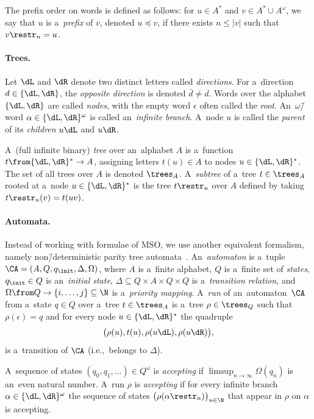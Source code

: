 \documentclass{lmcs}
\numberwithin{equation}{section}
\numberwithin{figure}{section}
\begin{document}
The prefix order on words is defined as follows: for $u\in A^\ast$ and $v\in A^\ast\cup A^\omega$, we say that $u$ is a~\emph{prefix} of $v$, denoted $u\preceq v$, if there exists $n\leq |v|$ such that $v\restr_n = u$.


\paragraph*{Trees.}
Let $\dL$ and $\dR$ denote two distinct letters called \emph{directions}.
For a~direction $d\in\{\dL,\dR\}$, the \emph{opposite direction} is denoted $\bar{d}\neq d$.
Words over the alphabet $\{\dL,\dR\}$ are called \emph{nodes}, with the empty word $\epsilon$ often called the \emph{root}.
An~$\omega$\=/word $\alpha\in\{\dL,\dR\}^\omega$ is called an~\emph{infinite branch}.
A~node $u$ is called the \emph{parent} of its \emph{children} $u \dL$ and $u\dR$.

A~(full infinite binary) \emph{tree} over an~alphabet $A$ is a~function $t\from \{\dL,\dR\}^\ast\to A$, assigning letters $t(u)\in A$ to nodes $u\in\{\dL,\dR\}^\ast$.
The set of all trees over $A$ is denoted $\trees_A$.
A~\emph{subtree} of a~tree $t\in\trees_A$ rooted at a~node $u\in\{\dL,\dR\}^\ast$ is the tree $t\restr_u$ over $A$ defined by taking $t\restr_u(v) = t(uv)$.


\paragraph*{Automata.}
Instead of working with formulae of MSO, we use another equivalent formalism, namely non\=/deterministic parity tree automata~\cite{thomas_languages}.
An~\emph{automaton} is a~tuple $\CA=(A,Q, q_{\init}, \Delta,\Omega)$, where $A$ is a~finite alphabet, $Q$ is a~finite set of \emph{states}, $q_{\init}\in Q$ is an~\emph{initial state},
$\Delta\subseteq Q\times A\times Q\times Q$ is a~\emph{transition relation}, and $\Omega\from Q\to \{i,\ldots,j\}\subseteq \N$ is a~\emph{priority mapping}.
A~\emph{run} of an~automaton~$\CA$ from a~state $q\in Q$ over a~tree $t\in\trees_A$ is a~tree $\rho\in\trees_Q$ such that $\rho(\epsilon)=q$ and for every node $u\in\{\dL,\dR\}^\ast$ the quadruple
\[\big(\rho(u), t(u), \rho(u\dL),\rho(u \dR)\big),\]
is a~transition of $\CA$ (i.e.,~belongs to $\Delta$).

A~sequence of states $(q_0,q_1,\ldots)\in Q^\omega$ is \emph{accepting} if $\limsup_{n\to\infty} \Omega(q_n)$ is an~even natural number.
A~run $\rho$ is \emph{accepting} if for every infinite branch $\alpha\in\{\dL,\dR\}^\omega$ the sequence of states $\big(\rho(\alpha\restr_n)\big)_{n\in\N}$ that appear in $\rho$ on $\alpha$ is accepting.
\end{document}
